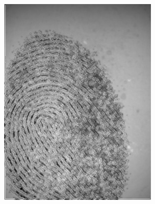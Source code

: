 \documentclass{beamer}
\begin{document}
{\begin{figure}[!ht]
\begin{subfigure}[ht]{0.15\textwidth}
            \includegraphics[width=\textwidth]{fingerprints/2004Db4a/1_1_background.jpg}
        \end{subfigure}
        \qquad
        \begin{subfigure}[ht]{0.15\textwidth}

\end{subfigure}
\end{figure}}
\end{document}
